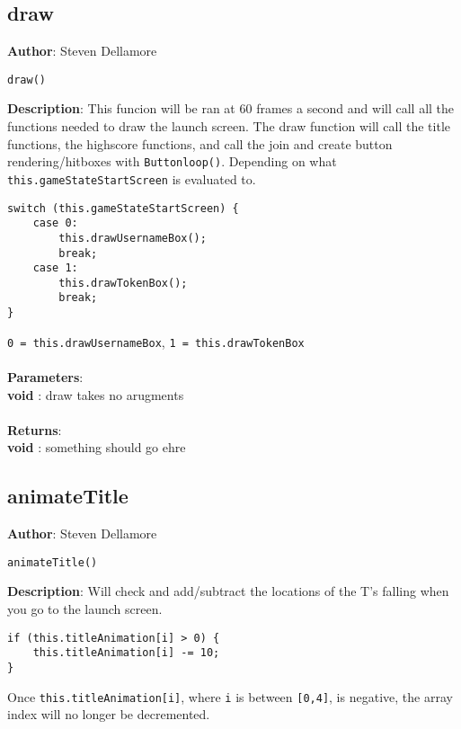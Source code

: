 \documentclass[12pt]{article}
\begin{document}
\subsection{draw}
\textbf{Author}: Steven Dellamore 
\vspace*{1\baselineskip}
\begin{lstlisting}
draw()
\end{lstlisting} 
\vspace*{1\baselineskip}
\textbf{Description}: This funcion will be ran at 60 frames a second and will call all the functions needed to draw the launch screen. The draw function will call the title functions, the highscore functions, and call the join and create button rendering/hitboxes with \texttt{Buttonloop()}. Depending on what \texttt{this.gameStateStartScreen} is evaluated to. 
\begin{verbatim}
switch (this.gameStateStartScreen) {
	case 0:
		this.drawUsernameBox(); 
		break;
	case 1:
		this.drawTokenBox();
		break;
}
\end{verbatim}
 \texttt{0 = this.drawUsernameBox}, \texttt{1 = this.drawTokenBox} \\


\textbf{\large{\\Parameters}}:\\
\textbf{void }: draw takes no arugments\\\textbf{\large{\\Returns}}:\\\textbf{void }: something should go ehre

\subsection{animateTitle}
\textbf{Author}: Steven Dellamore 
\vspace*{1\baselineskip}
\begin{lstlisting}
animateTitle()
\end{lstlisting} 
\vspace*{1\baselineskip}
\textbf{Description}: Will check and add/subtract the locations of the T's falling when you go to the launch screen. 
\begin{verbatim}
if (this.titleAnimation[i] > 0) {
	this.titleAnimation[i] -= 10;
}
\end{verbatim}
 Once \texttt{this.titleAnimation[i]}, where \texttt{i} is between \texttt{[0,4]}, is negative, the array index will no longer be decremented. \\
\end{document}
